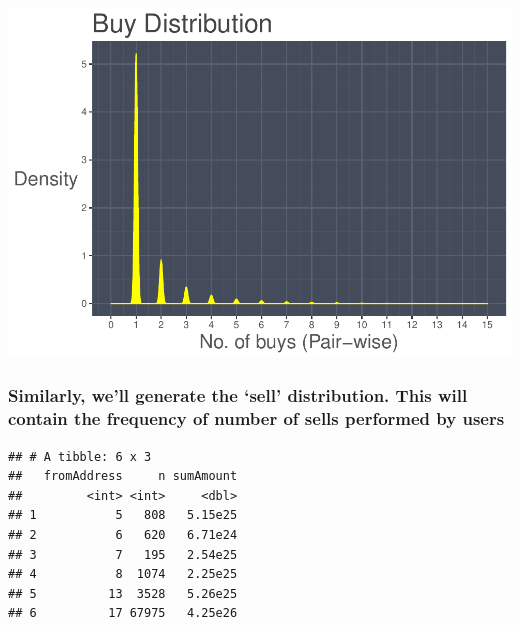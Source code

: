 \documentclass[]{article}
\newenvironment{Shaded}{\begin{snugshade}}{\end{snugshade}}
\newcommand{\KeywordTok}[1]{\textcolor[rgb]{0.13,0.29,0.53}{\textbf{#1}}}
\newcommand{\DataTypeTok}[1]{\textcolor[rgb]{0.13,0.29,0.53}{#1}}
\newcommand{\StringTok}[1]{\textcolor[rgb]{0.31,0.60,0.02}{#1}}
\newcommand{\OperatorTok}[1]{\textcolor[rgb]{0.81,0.36,0.00}{\textbf{#1}}}
\newcommand{\NormalTok}[1]{#1}
\begin{document}
\includegraphics{analysis_files/figure-latex/unnamed-chunk-9-1.pdf}

\subsubsection{\texorpdfstring{Similarly, we'll generate the `sell'
distribution. This will contain the frequency of number of sells
performed by
users}{Similarly, we'll generate the sell distribution. This will contain the frequency of number of sells performed by users}}\label{similarly-well-generate-the-sell-distribution.-this-will-contain-the-frequency-of-number-of-sells-performed-by-users}

\begin{Shaded}
\end{Shaded}

\begin{verbatim}
## # A tibble: 6 x 3
##   fromAddress     n sumAmount
##         <int> <int>     <dbl>
## 1           5   808   5.15e25
## 2           6   620   6.71e24
## 3           7   195   2.54e25
## 4           8  1074   2.25e25
## 5          13  3528   5.26e25
## 6          17 67975   4.25e26
\end{verbatim}
\end{document}

